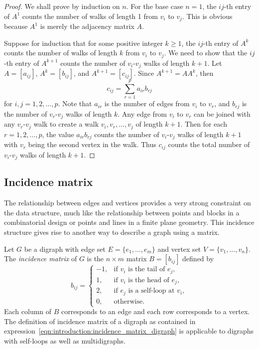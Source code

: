 \begin{proof}
We shall prove by induction on $n$. For the base case $n = 1$, the
$ij$-th entry of $A^1$ counts the number of walks of length 1 from
$v_i$ to $v_j$. This is obvious because $A^1$ is merely the adjacency
matrix $A$.

Suppose for induction that for some positive integer $k \geq 1$, the
$ij$-th entry of $A^k$ counts the number of walks of length $k$ from
$v_i$ to $v_j$. We need to show that the $ij$-th entry of $A^{k+1}$
counts the number of $v_i$-$v_j$ walks of length $k + 1$. Let
$A = [a_{ij}]$, $A^k = [b_{ij}]$, and $A^{k+1} = [c_{ij}]$. Since
$A^{k+1} = A A^k$, then
\[
c_{ij}
=
\sum_{r=1}^p a_{ir} b_{rj}
\]
for $i,j = 1, 2, \dots, p$. Note that $a_{ir}$ is the number of edges
from $v_i$ to $v_r$, and $b_{rj}$ is the number of $v_r$-$v_j$ walks
of length $k$. Any edge from $v_i$ to $v_r$ can be joined with any
$v_r$-$v_j$ walk to create a walk $v_i, v_r, \dots, v_j$ of length
$k + 1$. Then for each $r = 1, 2, \dots, p$, the value $a_{ir} b_{rj}$
counts the number of $v_i$-$v_j$ walks of length $k + 1$ with $v_r$
being the second vertex in the walk. Thus $c_{ij}$ counts the total
number of $v_i$-$v_j$ walks of length $k + 1$.
\end{proof}



\subsection{Incidence matrix}

The relationship between edges and vertices provides a very strong
constraint on the data structure, much like the relationship between
points and blocks in a combinatorial design or points and lines in a
finite plane geometry. This incidence structure gives rise to another
way to describe a graph using a matrix.

Let $G$ be a digraph with edge set $E = \{ e_1, \dots, e_m \}$ and
vertex set $V = \{ v_1, \dots, v_n \}$. The
\emph{incidence matrix} of $G$ is the
$n \times m$ matrix $B = [b_{ij}]$ defined by
\begin{equation}
\label{eqn:introduction:incidence_matrix_digraph}
b_{ij}
=
\begin{cases}
-1, & \text{if $v_i$ is the tail of $e_j$}, \\[4pt]
1,  & \text{if $v_i$ is the head of $e_j$}, \\[4pt]
2,  & \text{if $e_j$ is a self-loop at $v_i$}, \\[4pt]
0,  & \text{otherwise}.
\end{cases}
\end{equation}
Each column of $B$ corresponds to an edge and each row corresponds to
a vertex. The definition of incidence matrix of a digraph as contained
in expression~\eqref{eqn:introduction:incidence_matrix_digraph} is
applicable to digraphs with self-loops as well as multidigraphs.

